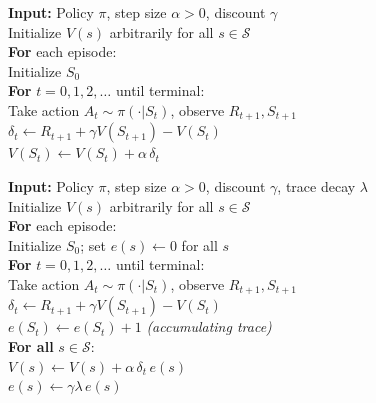 \documentclass[11pt,a4paper]{article}
\theoremstyle{definition}
\theoremstyle{plain}
\theoremstyle{remark}
\begin{document}
\begin{tcolorbox}[colback=white, colframe=black!70, title={\textbf{Algorithm 1:} Tabular TD(0) Prediction}, breakable]
\label{alg:td0}
\textbf{Input:} Policy $\pi$, step size $\alpha > 0$, discount $\gamma$\\[2pt]
Initialize $V(s)$ arbitrarily for all $s \in \mathcal{S}$\\
\textbf{For} each episode:\\
\quad Initialize $S_0$\\
\quad \textbf{For} $t = 0, 1, 2, \ldots$ until terminal:\\
\quad\quad Take action $A_t \sim \pi(\cdot|S_t)$, observe $R_{t+1}, S_{t+1}$\\
\quad\quad $\delta_t \leftarrow R_{t+1} + \gamma V(S_{t+1}) - V(S_t)$\\
\quad\quad $V(S_t) \leftarrow V(S_t) + \alpha\,\delta_t$
\end{tcolorbox}

\begin{tcolorbox}[colback=white, colframe=black!70, title={\textbf{Algorithm 2:} Tabular TD($\lambda$) with Eligibility Traces}, breakable]
\label{alg:td_lambda}
\textbf{Input:} Policy $\pi$, step size $\alpha > 0$, discount $\gamma$, trace decay $\lambda$\\[2pt]
Initialize $V(s)$ arbitrarily for all $s \in \mathcal{S}$\\
\textbf{For} each episode:\\
\quad Initialize $S_0$; set $e(s) \leftarrow 0$ for all $s$\\
\quad \textbf{For} $t = 0, 1, 2, \ldots$ until terminal:\\
\quad\quad Take action $A_t \sim \pi(\cdot|S_t)$, observe $R_{t+1}, S_{t+1}$\\
\quad\quad $\delta_t \leftarrow R_{t+1} + \gamma V(S_{t+1}) - V(S_t)$\\
\quad\quad $e(S_t) \leftarrow e(S_t) + 1$ \hfill \textit{(accumulating trace)}\\
\quad\quad \textbf{For all} $s \in \mathcal{S}$:\\
\quad\quad\quad $V(s) \leftarrow V(s) + \alpha\,\delta_t\,e(s)$\\
\quad\quad\quad $e(s) \leftarrow \gamma\lambda\,e(s)$
\end{tcolorbox}
\end{document}

